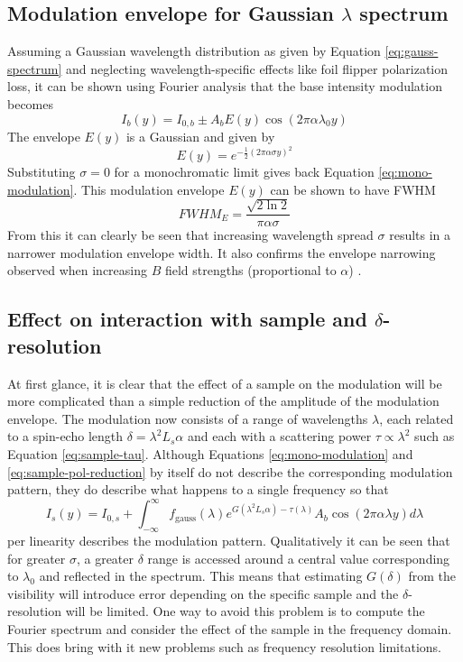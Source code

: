 \subsection{Modulation envelope for Gaussian $\lambda$ spectrum}
Assuming a Gaussian wavelength distribution as given by Equation \eqref{eq:gauss-spectrum} and neglecting wavelength-specific effects like foil flipper polarization loss, it can be shown using Fourier analysis that the base intensity modulation becomes
\begin{equation}
	I_b(y) = I_{0,b} \pm A_bE(y)\cos(2\pi\alpha\lambda_0y) \label{eq:poly-base-modulation}
\end{equation}
The envelope $E(y)$ is a Gaussian and given by
\begin{equation}
	E(y) = e^{-\frac{1}{2}\left(2\pi\alpha\sigma y\right)^2} \label{eq:poly-base-modulation-env}
\end{equation}
Substituting $\sigma=0$ for a monochromatic limit gives back Equation \eqref{eq:mono-modulation}. This modulation envelope $E(y)$ can be shown to have FWHM 
\begin{equation}
	FWHM_E = \frac{\sqrt{2\ln 2}}{\pi\alpha\sigma} \label{eq:poly-base-modulation-fwhm}
\end{equation}
From this it can clearly be seen that increasing wavelength spread $\sigma$ results in a narrower modulation envelope width. It also confirms the envelope narrowing observed when increasing $B$ field strengths (proportional to $\alpha$) \cite{bouwman2021}. 
\subsection{Effect on interaction with sample and $\delta$-resolution}
At first glance, it is clear that the effect of a sample on the modulation will be more complicated than a simple reduction of the amplitude of the modulation envelope. The modulation now consists of a range of wavelengths $\lambda$, each related to a spin-echo length $\delta = \lambda^2 L_s\alpha$ and each with a scattering power $\tau \propto\lambda^2$ such as Equation \eqref{eq:sample-tau}. Although Equations \eqref{eq:mono-modulation} and \eqref{eq:sample-pol-reduction} by itself do not describe the corresponding modulation pattern, they do describe what happens to a single frequency so that
\begin{equation}
	I_s(y) = I_{0,s} + \int_{-\infty}^\infty f_{\text{gauss}}(\lambda)e^{G(\lambda^2 L_s\alpha) - \tau(\lambda)}A_b\cos(2\pi\alpha\lambda y)d\lambda \label{eq:poly-sample-modulation}
\end{equation}
per linearity describes the modulation pattern. Qualitatively it can be seen that for greater $\sigma$, a greater $\delta$ range is accessed around a central value corresponding to $\lambda_0$ and reflected in the spectrum. This means that estimating $G(\delta)$ from the visibility will introduce error depending on the specific sample and the $\delta$-resolution will be limited. One way to avoid this problem is to compute the Fourier spectrum and consider the effect of the sample in the frequency domain. This does bring with it new problems such as frequency resolution limitations. 


